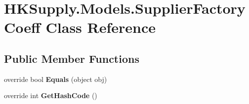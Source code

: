 \hypertarget{class_h_k_supply_1_1_models_1_1_supplier_factory_coeff}{}\section{H\+K\+Supply.\+Models.\+Supplier\+Factory\+Coeff Class Reference}
\label{class_h_k_supply_1_1_models_1_1_supplier_factory_coeff}
\subsection*{Public Member Functions}
\begin{DoxyCompactItemize}
\item 
\mbox{\label{class_h_k_supply_1_1_models_1_1_supplier_factory_coeff_a9e907ce43832bba327bec0225354c0ae}} 
override bool {\bfseries Equals} (object obj)
\item 
\mbox{\label{class_h_k_supply_1_1_models_1_1_supplier_factory_coeff_a4ca1059dfecff56ecdc689eda674e623}} 
override int {\bfseries Get\+Hash\+Code} ()
\end{DoxyCompactItemize}
